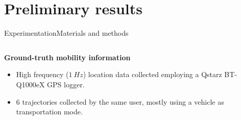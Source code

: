 \section{Preliminary results}
\begin{frame}{Experimentation}{Materials and methods}
\small 
\vspace{-0.5cm}
\begin{columns}
\begin{column}[T]{0.55\textwidth}
\begin{block}{\small \textbf{Ground-truth mobility information}}
  \begin{itemize}
    \item High frequency ($1~Hz$) location data collected employing a Qstarz BT-Q1000eX GPS logger.
    \item 6 trajectories collected by the same user, mostly using a vehicle as transportation mode.
  \end{itemize}
\end{block}
\end{column}

\begin{column}[T]{0.45\textwidth}
\begin{table}
\centering
\renewcommand{\arraystretch}{0.6}
\caption{Input parameters for the discovery of ground truth mobility information.}
\label{tab:exp-gt-input-parameters}
\end{table}
\end{column}
\end{columns}


\end{frame}
